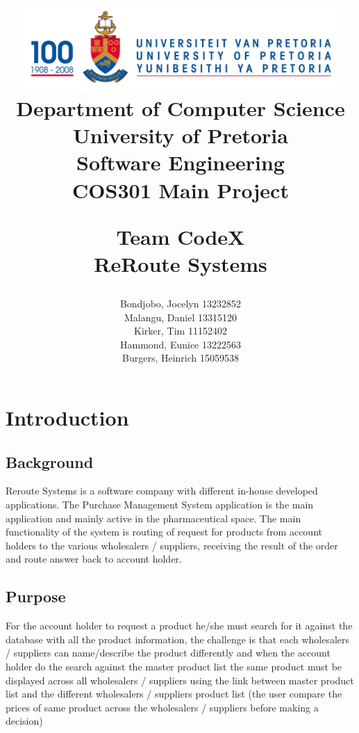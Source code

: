\documentclass[a4paper,10pt]{article}
\title{\includegraphics[width=12cm]{Eeufeeslogo.jpg} \\
       Department of Computer Science \\
       University of Pretoria \\
       \vspace{0.5cm}
       Software Engineering\\
       COS301 Main Project \\
       \vspace{0.5cm}
       \begin{large} \textbf{Team CodeX}\\ ReRoute Systems\end{large}}
\date{}
\author{	Bondjobo, Jocelyn 		13232852 		\\
		Malangu, Daniel		13315120		\\
		Kirker, Tim			11152402		\\
		Hammond, Eunice		13222563		\\
		Burgers, Heinrich		15059538		\\
}
\begin{document}
\maketitle
\thispagestyle{empty}
\clearpage

\newpage
{}
\thispagestyle{empty}
\tableofcontents
\clearpage

\newpage
{}

\section{Introduction}

	\subsection{Background} 
	Reroute Systems is a software company with different in-house developed applications. The Purchase Management System application is the main application and mainly active in the 		pharmaceutical space. The main functionality of the system is routing of request for products from account holders to the various wholesalers / suppliers, receiving the result of the order and route answer back to account holder.
	\subsection{Purpose} 	
	For the account holder to request a product he/she must search for it against the database with all the product information, the challenge is that each wholesalers / suppliers can name/describe the product differently and when the account holder do the search against the master product list the same product must be displayed across all wholesalers / suppliers using the link between master product list and the different wholesalers / suppliers product list (the user compare the prices of same product across the wholesalers / suppliers before making a decision)
\end{document}
